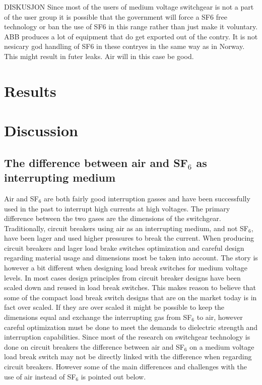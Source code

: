 \documentclass[10pt,a4paper]{article} %
\begin{document}
DISKUSJON
Since most of the users of medium voltage switchgear is not a part of the user group it is possible that the government will force a SF6 free technology or ban the use of SF6 in this range rather than just make it voluntary. ABB produces a lot of equipment that do get exported out of the contry. It is not nesicary god handling of SF6 in these contryes in the same way as in Norway. This might result in futer leaks. Air will in this case be good.

\section{Results}

\newpage

\section{Discussion}
\subsection{The difference between air and SF$_6$ as interrupting medium} \label{sec:airandsf} 
Air and SF$_6$ are both fairly good interruption gasses and have been successfully used in the past to interrupt high currents at high voltages. The primary difference between the two gases are the dimensions of the switchgear. Traditionally, circuit breakers using air as an interrupting medium, and not SF$_6$, have been lager and used higher pressures to break the current. When producing circuit breakers and lager load brake switches optimization and careful design regarding material usage and dimensions most be taken into account. The story is however a bit different when designing load break switches for medium voltage levels. In most cases design principles from circuit breaker designs have been scaled down and reused in load break switches. This makes reason to believe that some of the compact load break switch designs that are on the market today is in fact over scaled. If they are over scaled it might be possible to keep the dimensions equal and exchange the interrupting gas from SF$_6$ to air, however careful optimization must be done to meet the demands to dielectric strength and interruption capabilities. Since most of the research on switchgear technology is done on circuit breakers the difference between air and SF$_6$ on a medium voltage load break switch may not be directly linked with the difference when regarding circuit breakers. However some of the main differences and challenges with the use of air instead of SF$_6$ is pointed out below.
\end{document}
